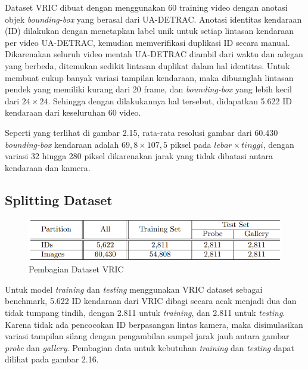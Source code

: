 Dataset VRIC dibuat dengan menggunakan 60 training video dengan anotasi objek \linebreak \emph{bounding-box} yang berasal dari UA-DETRAC. Anotasi identitas kendaraan (ID) dilakukan dengan menetapkan 
label unik untuk setiap lintasan kendaraan per video UA-DETRAC, kemudian memverifikasi duplikasi ID secara manual. Dikarenakan seluruh video mentah UA-DETRAC diambil dari waktu dan adegan 
yang berbeda, ditemukan sedikit lintasan duplikat dalam hal identitas. Untuk membuat cukup banyak variasi tampilan kendaraan, maka dibuanglah lintasan pendek yang memiliki kurang dari 20 
frame, dan \emph{bounding-box} yang lebih kecil dari \begin{math}24 \times 24\end{math}. Sehingga dengan dilakukannya hal tersebut, didapatkan 5.622 ID kendaraan dari keseluruhan 60 video. 
\parencite{Kanaci2018}

Seperti yang terlihat di gambar 2.15, rata-rata resolusi gambar dari 60.430 \emph{bounding-box} kendaraan adalah \begin{math}69,8 \times 107,5\end{math} piksel pada 
\begin{math}lebar \times tinggi\end{math}, dengan variasi 32 hingga 280 piksel dikarenakan jarak yang tidak dibatasi antara kendaraan dan kamera. \parencite{Kanaci2018}

\subsection{Splitting Dataset}

\begin{figure}[h!]
  \centering
  \includegraphics[scale=0.8]{gambar/Pembagian dataset VRIC.png}
  \caption{Pembagian Dataset VRIC}
  \label{fig:pembagiandatasetvric}
\end{figure}

Untuk model \emph{training} dan \emph{testing} menggunakan VRIC dataset sebagai benchmark, 5.622 ID kendaraan dari VRIC dibagi secara acak menjadi dua dan tidak tumpang tindih, dengan 
2.811 untuk \emph{training}, dan 2.811 untuk \emph{testing}. Karena tidak ada pencocokan ID berpasangan lintas kamera, maka disimulasikan variasi tampilan silang dengan pengambilan 
sampel jarak jauh antara gambar \emph{probe} dan \emph{gallery}.\parencite{Kanaci2018} Pembagian data untuk kebutuhan \emph{training} dan \emph{testing} dapat dilihat pada gambar 2.16.

